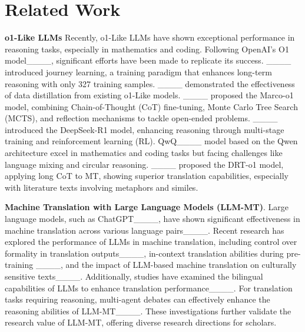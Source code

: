 \section{Related Work}
\textbf{o1-Like LLMs} Recently, o1-Like LLMs have shown exceptional performance in reasoning tasks, especially in mathematics and coding. Following OpenAI's O1 model____, significant efforts have been made to replicate its success. ____ introduced journey learning, a training paradigm that enhances long-term reasoning with only 327 training samples. ____ demonstrated the effectiveness of data distillation from existing o1-Like models. ____ proposed the Marco-o1 model, combining Chain-of-Thought (CoT) fine-tuning, Monte Carlo Tree Search (MCTS), and reflection mechanisms to tackle open-ended problems. ____ introduced the DeepSeek-R1 model, enhancing reasoning through multi-stage training and reinforcement learning (RL). QwQ____ model based on the Qwen architecture excel in mathematics and coding tasks but facing challenges like language mixing and circular reasoning. ____ proposed the DRT-o1 model, applying long CoT to MT, showing superior translation capabilities, especially with literature texts involving metaphors and similes.

\textbf{Machine Translation with Large Language Models (LLM-MT)}. Large language models, such as ChatGPT____, have shown significant effectiveness in machine translation across various language pairs____. Recent research has explored the performance of LLMs in machine translation, including control over formality in translation outputs____, in-context translation abilities during pre-training ____, and the impact of LLM-based machine translation on culturally sensitive texts____. Additionally, studies have examined the bilingual capabilities of LLMs to enhance translation performance____. For translation tasks requiring reasoning, multi-agent debates can effectively enhance the reasoning abilities of LLM-MT____. These investigations further validate the research value of LLM-MT, offering diverse research directions for scholars.





